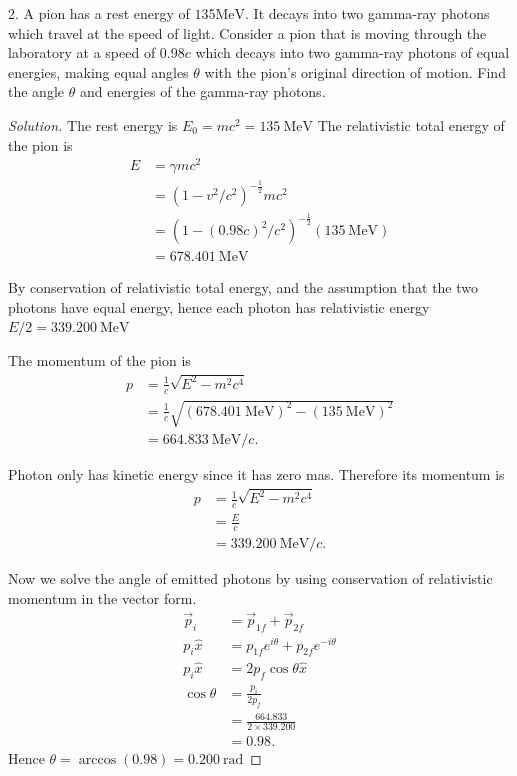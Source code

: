 2. A pion has a rest energy of $135 \mathrm{MeV}$. It decays into two gamma-ray photons which travel at the speed of light. Consider a pion that is moving through the laboratory at a speed of $0.98 c$ which decays into two gamma-ray photons of equal energies, making equal angles $\theta$ with the pion's original direction of motion. Find the angle $\theta$ and energies of the gamma-ray photons.
\begin{proof}[Solution]
	The rest energy is $E_0 = mc^2 = \SI{135}{\mega\electronvolt}$
	The relativistic total energy of the pion is 
	\begin{align*}
		E &=  \gamma m c^2 \\
		  &= \left( 1 - v^2 / c^2 \right) ^{-\frac{1}{2}} mc^2 \\
		  &=  (1 - (0.98c)^2 / c^2)^{-\frac{1}{2}} (\SI{135}{\mega\electronvolt})\\
		  &= \SI{678.401}{\mega\electronvolt}
	\end{align*}

	By conservation of relativistic total energy, and the assumption that the two photons have equal energy, hence each photon has relativistic energy $E / 2 =\SI{339.200}{\mega\electronvolt} $

	The momentum of the pion is
	\begin{align*}
		p &= \frac{1}{c}\sqrt{E^2 - m^2 c^4}\\ 
		&= \frac{1}{c}\sqrt{
			\left( \SI{678.401}{\mega\electronvolt} \right)^2 -  \left( \SI{135}{\mega\electronvolt} \right) ^2
		}  \\
		&= \SI{664.833}{\mega\electronvolt \per c}
	.\end{align*}

	Photon only has kinetic energy since it has zero mas. Therefore its momentum is
	\begin{align*}
		p &= \frac{1}{c}\sqrt{E^2 - m^2 c^4}\\ 
		&= \frac{E}{c}  \\
		&= \SI{339.200}{\mega\electronvolt\per c} 
	.\end{align*}

	Now we solve the angle of emitted photons by using conservation of relativistic momentum in the vector form.
	\begin{align*}
		\vec{p} _i &= \vec{p} _{1f} + \vec{p} _{2f}\\
		p_i \hat{x} &= p_{1f} e^{i \theta} + p_{2 f} e^{- i \theta} \\
		p_i \hat{x}  &= 2 p_f \cos \theta \hat{x}  \\
		\cos \theta &= \frac{p_i}{2 p_f} \\
		&=  \frac{664.833}{2 \times 339.200}\\
		&= 0.98
	.\end{align*}
	Hence $\theta = \arccos(0.98) = \SI{0.200}{\radian}$
\end{proof}

